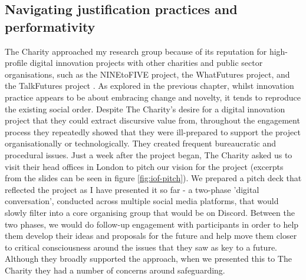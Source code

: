 \subsection{Navigating justification practices and performativity}
The Charity approached my research group because of its reputation for high-profile digital innovation projects with other charities and public sector organisations, such as the NINEtoFIVE project, the WhatFutures project, and the TalkFutures project \citep{lambton-howard_whatfutures:_2019, rainey_talkfutures_2020, abdulgalimov_designing_2020}. As explored in the previous chapter, whilst innovation practice appears to be about embracing change and novelty, it tends to reproduce the existing social order. Despite The Charity's desire for a digital innovation project that they could extract discursive value from, throughout the engagement process they repeatedly showed that they were ill-prepared to support the project organisationally or technologically. They created frequent bureaucratic and procedural issues. Just a week after the project began, The Charity asked us to visit their head offices in London to pitch our vision for the project (excerpts from the slides can be seen in figure \ref{fig:iof-pitch}). We prepared a pitch deck that reflected the project as I have presented it so far - a two-phase 'digital conversation', conducted across multiple social media platforms, that would slowly filter into a core organising group that would be on Discord. Between the two phases, we would do follow-up engagement with participants in order to help them develop their ideas and proposals for the future and help move them closer to critical consciousness around the issues that they saw as key to a future. Although they broadly supported the approach, when we presented this to The Charity they had a number of concerns around safeguarding. 


